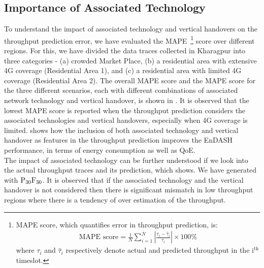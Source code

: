 \subsection{Importance of Associated Technology}
\indent To understand the impact of associated technology and vertical handovers on the throughput prediction error, we have evaluated the MAPE~\footnote{\indent MAPE score, which quantifies error in throughput prediction,  is:
\begin{align}
\text{MAPE\ score} = \frac{1}{N}\sum_{i=1}^N\left|\frac{\tau_i-\hat{\tau}_i}{\tau_i}\right|\times 100\%
\end{align}
where $\tau_i$ and $\hat{\tau}_i$ respectively denote actual and  predicted throughput in the $\mathrm{i^{th}}$ timeslot.} score over different regions. For this, we have divided the data traces collected in Kharagpur into three categories - (a) crowded Market Place, (b) a residential area with extensive 4G coverage (Residential Area 1), and (c) a residential area with limited 4G coverage (Residential Area 2). The overall MAPE score and the MAPE score for the three different scenarios, each with different combinations of associated network technology and vertical handover, is shown in \fig{\ref{fig:MAPE_diff_scene}}. It is observed that the lowest MAPE score is reported when the throughput prediction considers the associated technologies and vertical handovers, especially when 4G coverage is limited. 
\fig{\ref{fig:Perf_VHO}} shows how the inclusion of both associated technology and vertical handover as features in the throughput prediction improves the EnDASH performance, in terms of energy consumption as well as \ac{QoE}.\\
\indent The impact of associated technology can be further understood if we look into the actual throughput traces and its prediction, which \fig{\ref{fig:thpt_pred_trace}} shows.  %
We have generated  \fig{\ref{fig:thpt_pred_trace}} with $\mathrm{P_{30}F_{30}}$.
 It is observed that if the associated technology and the vertical handover is not considered then there is significant mismatch in low throughput regions where there is a tendency of over estimation of the throughput.
